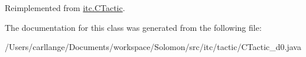 Reimplemented from \hyperlink{classitc_1_1_c_tactic_ae5f5c51a6e04d22bc298dbdec4080770}{itc.CTactic}.

The documentation for this class was generated from the following file:\begin{DoxyCompactItemize}
\item 
/Users/carllange/Documents/workspace/Solomon/src/itc/tactic/CTactic\_\-d0.java\end{DoxyCompactItemize}
